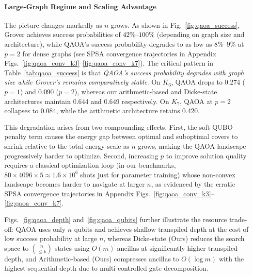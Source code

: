\documentclass{ieeeaccess}
\begin{document}
\paragraph{Large-Graph Regime and Scaling Advantage}
The picture changes markedly as $n$ grows. As shown in
Fig.~\ref{fig:qaoa_success}, Grover achieves success
probabilities of $42\%$--$100\%$ (depending on graph size
and architecture), while QAOA's success probability
degrades to as low as $8\%$--$9\%$ at $p=2$ for dense
graphs (see SPSA convergence trajectories in Appendix
Figs.~\ref{fig:qaoa_conv_k3}--\ref{fig:qaoa_conv_k7}).
The critical pattern in Table~\ref{tab:qaoa_success} is
that \emph{QAOA's success probability degrades with graph
size while Grover's remains comparatively stable}. On
$K_6$, QAOA drops to 0.274 ($p=1$) and 0.090 ($p=2$),
whereas our arithmetic-based and Dicke-state architectures
maintain 0.644 and 0.649 respectively. On $K_7$, QAOA at
$p=2$ collapses to 0.084, while the arithmetic
architecture retains 0.420.

This degradation arises from two compounding effects.
First, the soft QUBO penalty term causes the energy gap
between optimal and suboptimal covers to shrink relative
to the total energy scale as $n$ grows, making the QAOA
landscape progressively harder to optimize. Second,
increasing $p$ to improve solution quality requires a
classical optimization loop (in our benchmarks,
$80 \times 4096 \times 5 \approx 1.6 \times 10^6$ shots
just for parameter training) whose non-convex landscape
becomes harder to navigate at larger $n$, as evidenced by
the erratic SPSA convergence trajectories in Appendix
Figs.~\ref{fig:qaoa_conv_k3}--\ref{fig:qaoa_conv_k7}.

Figs.~\ref{fig:qaoa_depth} and~\ref{fig:qaoa_qubits}
further illustrate the resource trade-off: QAOA uses only
$n$ qubits and achieves shallow transpiled depth at the
cost of low success probability at large $n$, whereas
Dicke-state (Ours) reduces the search space to
$\binom{n}{\leq k}$ states using $O(m)$ ancillas at
significantly higher transpiled depth, and
Arithmetic-based (Ours) compresses ancillas to $O(\log m)$
with the highest sequential depth due to multi-controlled
gate decomposition.

\end{document}
